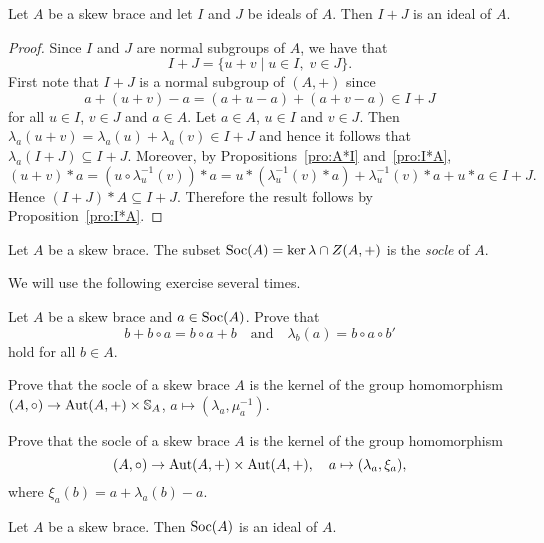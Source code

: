\begin{proposition}
Let $A$ be a skew brace and let
$I$ and $J$ be ideals of $A$. Then $I+J$ is an ideal of $A$.
\end{proposition}

\begin{proof}
    Since $I$ and $J$ are normal subgroups of $A$, we have that
    \[ I+J=\{ u+v \mid u\in I,\; v\in J \}.\]
    First note that $I+J$ is a normal subgroup of $(A,+)$ since
    \[
        a+(u+v)-a=(a+u-a)+(a+v-a)\in I+J
    \]
    for all $u\in I$, $v\in J$ and $a\in A$.
    Let $a\in A$, $u\in I$ and $v\in J$. Then $\lambda_a(u+v)=\lambda_a(u)+\lambda_a(v)\in I+J$ and
    hence it follows that $\lambda_a(I+J)\subseteq I+J$. Moreover, by Propositions~\ref{pro:A*I} and~\ref{pro:I*A},
        \[
        (u+v)*a=(u\circ\lambda^{-1}_u(v))*a
        =u*(\lambda^{-1}_u(v)*a)+\lambda^{-1}_u(v)*a+u*a\in I+J.
    \]
    Hence $(I+J)*A\subseteq I+J$. Therefore the result follows by Proposition~\ref{pro:I*A}.
\end{proof}


\begin{definition}
	Let $A$ be a skew brace. The subset 
	$\operatorname{Soc}(A)=\ker\lambda\cap Z(A,+)$
	is the \emph{socle} of $A$.
\end{definition}

We will use the following exercise several times. 

\begin{exercise}
    \label{xca:socle}
    Let $A$ be a skew brace and $a\in\operatorname{Soc}(A)$. Prove that  
    \[
    b+b\circ a=b\circ a+b\quad\text{and}\quad
    \lambda_b(a)=b\circ a\circ b'
    \]
    hold 
    for all $b\in A$.
\end{exercise}

\begin{exercise}
\label{xca:Bachiller1}
    Prove that the socle of a skew brace $A$ is the kernel of the 
    group homomorphism $(A,\circ)\to\operatorname{Aut}(A,+)\times\mathbb{S}_A$, $a\mapsto (\lambda_a,\mu_a^{-1})$. 
\end{exercise}

\begin{exercise}
\label{xca:Bachiller2}
    Prove that the socle of a skew brace $A$ is the kernel of the 
    group homomorphism 
    \[
    (A,\circ)\to\operatorname{Aut}(A,+)\times\operatorname{Aut}(A,+),
    \quad
    a\mapsto (\lambda_a,\xi_a),
    \]
    where
    $\xi_a(b)=a+\lambda_a(b)-a$. 
\end{exercise}

\begin{proposition}
	\label{pro:socle}
	Let $A$ be a skew brace. Then $\operatorname{Soc}(A)$ is an ideal of $A$.
\end{proposition}

